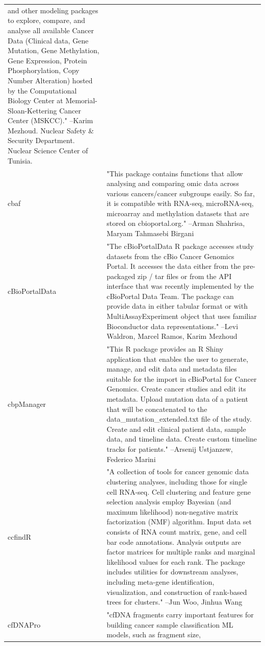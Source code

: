 \documentclass[]{article}
\begin{document}
\begin{longtable}[t]{l>{\raggedright\arraybackslash}p{25em}}
and other modeling packages to explore, compare, and analyse
all available Cancer Data (Clinical data, Gene Mutation, Gene
Methylation, Gene Expression, Protein Phosphorylation, Copy
Number Alteration) hosted by the Computational Biology Center
at Memorial-Sloan-Kettering Cancer Center (MSKCC)." --Karim Mezhoud. Nuclear Safety \& Security Department. Nuclear Science Center of Tunisia.\\
cbaf & "This package contains functions that allow analysing and
comparing omic data across various cancers/cancer subgroups
easily. So far, it is compatible with RNA-seq, microRNA-seq,
microarray and methylation datasets that are stored on
cbioportal.org." --Arman Shahrisa, Maryam Tahmasebi Birgani\\
cBioPortalData & "The cBioPortalData R package accesses study datasets from
the cBio Cancer Genomics Portal. It accesses the data either
from the pre-packaged zip / tar files or from the API interface
that was recently implemented by the cBioPortal Data Team. The
package can provide data in either tabular format or with
MultiAssayExperiment object that uses familiar Bioconductor
data representations." --Levi Waldron, Marcel Ramos, Karim Mezhoud\\
cbpManager & "This R package provides an R Shiny application that
enables the user to generate, manage, and edit data and
metadata files suitable for the import in cBioPortal for Cancer
Genomics. Create cancer studies and edit its metadata. Upload
mutation data of a patient that will be concatenated to the
data\_mutation\_extended.txt file of the study. Create and edit
clinical patient data, sample data, and timeline data. Create
custom timeline tracks for patients." --Arsenij Ustjanzew, Federico Marini\\
ccfindR & "A collection of tools for cancer genomic data clustering
analyses, including those for single cell RNA-seq. Cell
clustering and feature gene selection analysis employ Bayesian
(and maximum likelihood) non-negative matrix factorization
(NMF) algorithm. Input data set consists of RNA count matrix,
gene, and cell bar code annotations.  Analysis outputs are
factor matrices for multiple ranks and marginal likelihood
values for each rank. The package includes utilities for
downstream analyses, including meta-gene identification,
visualization, and construction of rank-based trees for
clusters." --Jun Woo, Jinhua Wang\\
\addlinespace
cfDNAPro & "cfDNA fragments carry important features for building
cancer sample classification ML models, such as fragment size,

\end{longtable}
\end{document}
